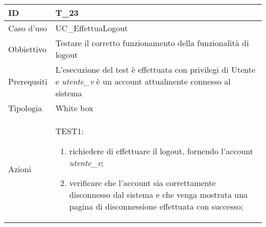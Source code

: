\begin{table}[hb]
    \centering
    \begin{tabular}{ |p{2cm}|p{10cm}|  }
        \hline
        ID          & T\_23                                                                                                                      \\\hline
        Caso d'uso  & UC\_EffettuaLogout                                                                                                         \\\hline
        Obbiettivo  & Testare il corretto funzionamento della funzionalità di logout                                                             \\\hline
        Prerequsiti & L'esecuzione del test è effettuata con privilegi di Utente e \emph{utente\_v} è un account attualmente connesso al sistema \\\hline
        Tipologia   & White box                                                                                                                  \\\hline
        Azioni      &
        TEST1:
        \begin{enumerate}[nosep, topsep=0pt]
            \item richiedere di effettuare il logout, fornendo l'account \emph{utente\_v};
            \item verificare che l'account sia correttamente disconnesso dal sistema e che venga mostrata una pagina di disconnessione effettuata con successo;
        \end{enumerate}
        \\\hline
    \end{tabular}
\end{table}

